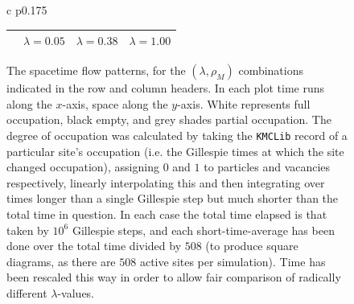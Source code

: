\begin{figure}[h!]
\caption{\label{fig:flowPatterns} The spacetime flow patterns, for the $(\lambda, \rho_M)$ combinations indicated in the row and column headers. In each plot time runs along the $x$-axis, space along the $y$-axis. White represents full occupation, black empty, and grey shades partial
occupation. The degree of occupation was calculated by taking the \texttt{KMCLib} record of a particular site's occupation (i.e. the Gillespie times at
which the site changed occupation), assigning $0$ and $1$ to particles and vacancies respectively, linearly interpolating this and then integrating over times longer than a single Gillespie step but much shorter than the total time in question.
In each case the total time elapsed is that taken by $10^6$ Gillespie steps, and each short-time-average has been done over the total time divided by $508$ (to produce square diagrams, as there are $508$ active sites
per simulation). Time has been rescaled this way in order to allow fair comparison of radically different $\lambda$-values.}
\begin{tabular}{c p{0.175\linewidth}}
\hspace{-2em}\begin{tabular}{c|c@{\hspace{0.25em}}c@{\hspace{0.25em}}c}
  &  $\lambda=0.05$ & $\lambda=0.38$ & $\lambda=1.00$ \\ 
  \hline

\end{tabular}
\end{tabular}
\end{figure}
